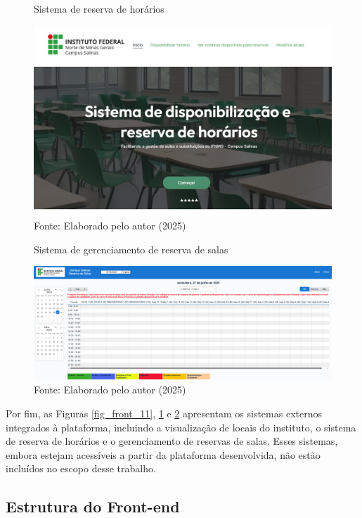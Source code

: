 \begin{figure}[H]
    \centering
    \caption{Sistema de reserva de horários}
    \includegraphics[width=1\textwidth]{Figuras/front-12.png}
    \caption*{Fonte: Elaborado pelo autor (2025)}
    \label{fig_front_12}
\end{figure}

\begin{figure}[htb]
    \centering
    \caption{Sistema de gerenciamento de reserva de salas}
    \includegraphics[width=1\textwidth]{Figuras/front-13.png}
    \caption*{Fonte: Elaborado pelo autor (2025)}
    \label{fig_front_13}
\end{figure}

Por fim, as Figuras \ref{fig_front_11}, \ref{fig_front_12} e \ref{fig_front_13} apresentam os sistemas externos integrados à plataforma, incluindo a visualização de locais do instituto, o sistema de reserva de horários e o gerenciamento de reservas de salas. Esses sistemas, embora estejam acessíveis a partir da plataforma desenvolvida, não estão incluídos no escopo desse trabalho.

\subsection{Estrutura do Front-end}

